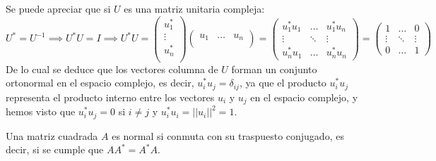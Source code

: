 \begin{observación}
    Se puede apreciar que si $U$ es una matriz unitaria compleja:
    \[
        U^* = U^{-1} \implies 
        U^* U = I \implies
        U^* U =
        \begin{pmatrix}
            u_1^* \\
            \vdots \\
            u_n^* \\
        \end{pmatrix}
        \begin{pmatrix}
            u_1 & \dots & u_n \\
        \end{pmatrix} =
        \begin{pmatrix}
            u_1^* u_1 & \dots & u_1^* u_n \\
            \vdots & \ddots & \vdots \\
            u_n^* u_1 & \dots & u_n^* u_n
        \end{pmatrix} =
        \begin{pmatrix}
            1 & \dots & 0 \\
            \vdots & \ddots & \vdots \\
            0 & \dots & 1
        \end{pmatrix}
    \]
    De lo cual se deduce que los vectores columna de $U$ forman un conjunto ortonormal en el espacio complejo, es decir, $u_i^* u_j = \delta_{ij}$, ya que el producto $u_i^* u_j$ representa el producto interno entre los vectores $u_i$ y $u_j$ en el espacio complejo, y hemos visto que $u_i^* u_j = 0$ si $i \neq j$ y $u_i^* u_i = ||u_i||^2 = 1$.
\end{observación}

\begin{definición}
    Una matriz cuadrada \( A \) es normal si conmuta con su traspuesto conjugado, es decir, si se cumple que \( A A^* = A^* A \).
\end{definición}

